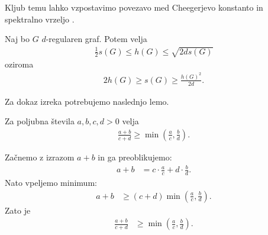 Kljub temu lahko vzpostavimo povezavo med Cheegerjevo konstanto in spektralno vrzeljo \cite{chung-cheeger}.
\begin{izrek}\label{cheeger-neenakost}
    Naj bo \(G\) \(d\)-regularen graf. Potem velja 
    \begin{align*}
        \frac{1}{2}s(G) \leq h(G) \leq \sqrt{2ds(G)}
    \end{align*}
    oziroma
    \begin{align*}
        2h(G) \geq s(G) \geq \frac{h(G)^2}{2d}.
    \end{align*} 
\end{izrek}
Za dokaz izreka potrebujemo naslednjo lemo.
\begin{lema}\label{cheegerLema}
    Za poljubna števila \(a, b, c, d > 0\) velja
    \begin{align*}
        \frac{a+b}{c+d} \geq \min\left(\frac{a}{c}, \frac{b}{d}\right).
    \end{align*}
\end{lema}
\begin{dokaz}
    Začnemo z izrazom \(a+b\) in ga preoblikujemo:
    \begin{align*}
        a+b &= c\cdot\frac{a}{c} + d\cdot \frac{b}{d}.
    \end{align*}
    Nato vpeljemo minimum:
    \begin{align*}
        a+b &\geq (c+d) \min\left(\frac{a}{c}, \frac{b}{d}\right).
    \end{align*}
    Zato je 
    \begin{align*}
        \frac{a+b}{c+d} &\geq \min\left(\frac{a}{c}, \frac{b}{d}\right).
    \end{align*}
\end{dokaz}
